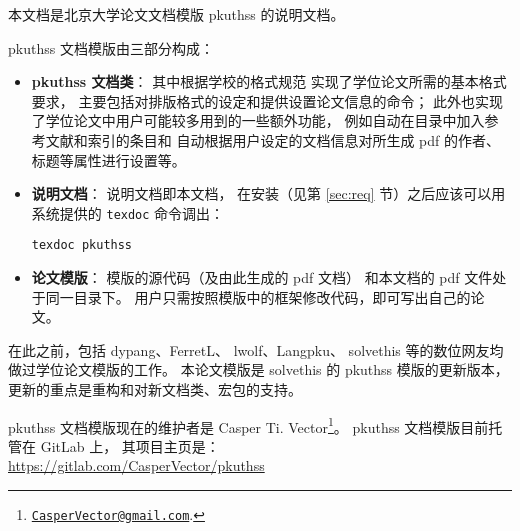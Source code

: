 %
%
%
%


本文档是北京大学论文文档模版 pkuthss 的说明文档。

pkuthss 文档模版由三部分构成：
\begin{itemize}
	\item \textbf{pkuthss 文档类}：
		其中根据学校的格式规范\mbox{\supercite{pku-thesisstyle}}%
		实现了学位论文所需的基本格式要求，
		主要包括对排版格式的设定和提供设置论文信息的命令；
		此外也实现了学位论文中用户可能较多用到的一些额外功能，
		例如自动在目录中加入参考文献和索引的条目和
		自动根据用户设定的文档信息对所生成 pdf 的作者、标题等属性进行设置等。
	\item \textbf{说明文档}：
		说明文档即本文档，
		在安装（见第 \ref{sec:req} 节）之后应该可以用  系统提供的
		\verb|texdoc| 命令调出：
\begin{Verbatim}[frame = single]
texdoc pkuthss
\end{Verbatim}
	\item \textbf{论文模版}：
		模版的源代码（及由此生成的 pdf 文档）
		和本文档的 pdf 文件处于同一目录下。
		用户只需按照模版中的框架修改代码，即可写出自己的论文。
\end{itemize}

在此之前，包括 dypang\supercite{dypang}、FerretL\supercite{FerretL}、%
lwolf\supercite{lwolf}、Langpku\supercite{Langpku}、%
solvethis\supercite{solvethis} 等的数位网友均做过学位论文模版的工作。
本论文模版是 solvethis 的 pkuthss 模版的更新版本，
更新的重点是重构和对新文档类、宏包的支持。

pkuthss 文档模版现在的维护者是 Casper Ti. Vector\footnote%
{\href{mailto:CasperVector@gmail.com}{\texttt{CasperVector@gmail.com}}.}。%
pkuthss 文档模版目前托管在 GitLab 上，
其项目主页是：\\
\hspace*{\parindent}\url{https://gitlab.com/CasperVector/pkuthss}

